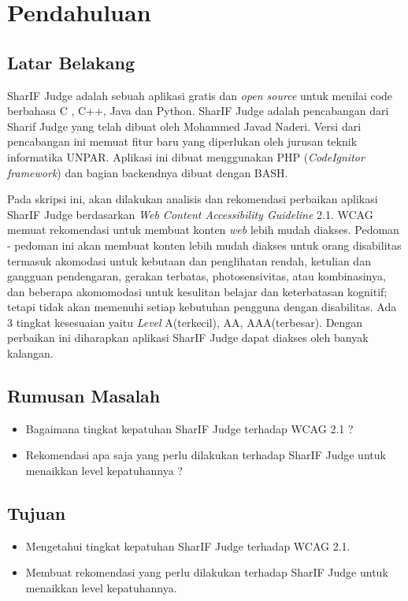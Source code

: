 \chapter{Pendahuluan}
\label{chap:intro}
   
\section{Latar Belakang}
\label{sec:label}
SharIF Judge adalah sebuah aplikasi gratis dan \textit{open source} untuk menilai code berbahasa C , C++, Java dan Python. SharIF Judge adalah pencabangan dari Sharif Judge yang telah dibuat oleh Mohammed Javad Naderi. Versi dari pencabangan ini memuat fitur baru yang diperlukan oleh jurusan teknik informatika UNPAR. Aplikasi ini dibuat menggunakan PHP (\textit{CodeIgnitor framework}) dan bagian backendnya dibuat dengan BASH.

Pada skripsi ini, akan dilakukan analisis dan rekomendasi perbaikan aplikasi SharIF Judge berdasarkan \textit{Web Content Accessibility Guideline} 2.1. WCAG memuat rekomendasi untuk membuat konten \textit{web} lebih mudah diakses. Pedoman - pedoman ini akan membuat konten lebih mudah diakses untuk orang disabilitas termasuk akomodasi untuk kebutaan dan penglihatan rendah, ketulian dan gangguan pendengaran, gerakan terbatas, photosensivitas, atau kombinasinya, dan beberapa akomomodasi untuk kesulitan belajar dan keterbatasan kognitif; tetapi tidak akan memenuhi setiap kebutuhan pengguna dengan disabilitas. Ada 3 tingkat kesesuaian yaitu \textit{Level} A(terkecil), AA, AAA(terbesar). Dengan perbaikan ini diharapkan aplikasi SharIF Judge dapat diakses oleh banyak kalangan.

\section{Rumusan Masalah}
\label{sec:rumusan}
\begin{itemize}
	\item Bagaimana tingkat kepatuhan SharIF Judge terhadap WCAG 2.1 ?
	\item Rekomendasi apa saja yang perlu dilakukan terhadap SharIF Judge untuk menaikkan level kepatuhannya ?
\end{itemize}

\section{Tujuan}
\label{sec:tujuan}
\begin{itemize}
	\item Mengetahui tingkat kepatuhan SharIF Judge terhadap WCAG 2.1.
	\item Membuat rekomendasi yang perlu dilakukan terhadap SharIF Judge untuk menaikkan level kepatuhannya.
\end{itemize} 

